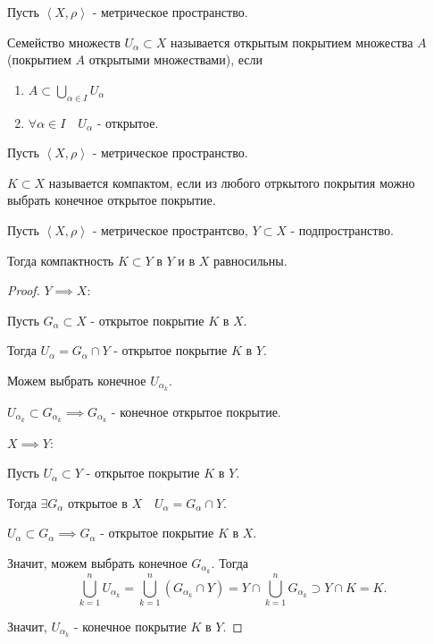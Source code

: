 
\begin{definition} \thmslashn 

    Пусть $\left<X, \rho\right>$ - метрическое пространство.

    Семейство множеств $U_{\alpha} \subset X$ называется открытым покрытием множества $A$ (покрытием $A$ открытыми множествами), если
    \begin{enumerate}
        \item $A \subset \bigcup_{\alpha\in I} U_{\alpha} $ 
        \item $\forall{\alpha\in I}\quad U_{\alpha}$ - открытое.
    \end{enumerate}
\end{definition}
\begin{definition} \thmslashn 

    Пусть $\left<X, \rho\right>$ - метрическое пространство.

    $K \subset X$ называется компактом, если из любого отркытого покрытия можно выбрать конечное открытое покрытие.
\end{definition}
\begin{theorem} \thmslashn

    Пусть $\left<X, \rho\right>$ - метрическое пространтсво, $Y \subset X$ - подпространство.

    Тогда компактность $K \subset Y$ в $Y$ и в $X$ равносильны.
    \begin{proof} \thmslashn
    
        $Y \implies X$:

        Пусть $G_{\alpha} \subset X$ - открытое покрытие $K$ в $X$.
        
        Тогда $U_{\alpha} = G_{\alpha}\cap Y$ - открытое покрытие $K$ в $Y$. 
        
        Можем выбрать конечное $U_{\alpha_{k}}$.
        
        $U_{\alpha_{k}} \subset G_{\alpha_{k}} \implies G_{\alpha_{k}}$ - конечное открытое покрытие.

        $X \implies Y$:

        Пусть $U_{\alpha} \subset Y$ - открытое покрытие $K$ в $Y$.

        Тогда $\exists{G_{\alpha} \text{ открытое в $X$}}\quad U_{\alpha} = G_{\alpha}\cap Y$.

        $U_{\alpha} \subset G_{\alpha} \implies G_{\alpha}$ - открытое покрытие $K$ в $X$.

        Значит, можем выбрать конечное $G_{\alpha_{k}}$. Тогда 
        \[ \bigcup_{k = 1}^{n} U_{\alpha_{k}} = \bigcup_{k = 1}^{n} (G_{\alpha_{k}}\cap  Y) = Y\cap \bigcup_{k=1}^{n}G_{\alpha_{k}} \supset Y\cap K = K .\]

        Значит, $U_{\alpha_{k}}$ - конечное покрытие $K$ в $Y$.
    \end{proof}
\end{theorem}

